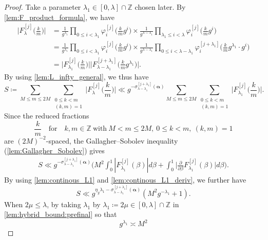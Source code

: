 \documentclass[hidelinks]{amsart}
\numberwithin{equation}{section}
\theoremstyle{plain}
\theoremstyle{definition}
\let\tmp\phi
\let\phi\varphi
\let\varphi\tmp
\let\tmp\epsilon
\let\epsilon\varepsilon
\let\varepsilon\tmp
\begin{document}
\begin{proof}
Take a parameter $\lambda_{1}\in[0,\lambda]\cap\mathbb{Z}$ chosen later.
By \cref{lem:F_product_formula}, we have
\begin{align}
\biggl|F_{\lambda}^{[j]}\biggl(\frac{k}{m}\biggr)\biggr|
&=
\frac{1}{g^{\lambda_{1}}}
\prod_{0\le i<\lambda_{1}}
\phi_{i}^{[j]}\biggl(\frac{k}{m}g^{i}\biggr)
\times
\frac{1}{g^{\lambda-\lambda_{1}}}
\prod_{\lambda_{1}\le i<\lambda}
\phi_{i}^{[j]}\biggl(\frac{k}{m}g^{i}\biggr)\\
&=
\frac{1}{g^{\lambda_{1}}}
\prod_{0\le i<\lambda_{1}}
\phi_{i}^{[j]}\biggl(\frac{k}{m}g^{i}\biggr)
\times
\frac{1}{g^{\lambda-\lambda_{1}}}
\prod_{0\le i<\lambda-\lambda_{1}}
\phi_{i}^{[j+\lambda_{1}]}\biggl(\frac{k}{m}g^{\lambda_{1}}\cdot g^{i}\biggr)\\
&=
\biggl|F_{\lambda_{1}}^{[j]}\biggl(\frac{k}{m}\biggr)\biggr|
\biggl|F_{\lambda-\lambda_{1}}^{[j+\lambda_{1}]}\biggl(\frac{k}{m}g^{\lambda_{1}}\biggr)\biggr|.
\end{align}
By using \cref{lem:L_infty_general}, we thus have
\[
S
\coloneqq
\sum_{M\le m\le 2M}
\sum_{\substack{
0\le k<m\\
(k,m)=1
}}
\biggl|F_{\lambda}^{[j]}\biggl(\frac{k}{m}\biggr)\biggr|
\ll
g^{-\sigma_{\lambda-\lambda_{1}}^{[j+\lambda_{1}]}(\bm{\alpha})}
\sum_{M\le m\le 2M}
\sum_{\substack{
0\le k<m\\
(k,m)=1
}}
\biggl|F_{\lambda_{1}}^{[j]}\biggl(\frac{k}{m}\biggr)\biggr|.
\]
Since the reduced fractions
\[
\frac{k}{m}
\quad\text{for}\quad
k,m\in\mathbb{Z}
\ \text{with}\ 
M<m\le 2M,\ 
0\le k<m,\ 
(k,m)=1
\]
are $(2M)^{-2}$-spaced, the Gallagher--Sobolev inequality (\cref{lem:Gallagher_Sobolev}) gives
\begin{align}
S
\ll
g^{-\sigma_{\lambda-\lambda_{1}}^{[j+\lambda_{1}]}(\bm{\alpha})}
\biggl(
M^{2}
\int_{0}^{1}|F_{\lambda_{1}}^{[j]}(\beta)|d\beta
+
\int_{0}^{1}
\biggl|\frac{\partial}{\partial\beta}F_{\lambda_{1}}^{[j]}(\beta)\biggr|d\beta
\biggr).
\end{align}
By using \cref{lem:continous_L1} and \cref{lem:continous_L1_deriv}, we further have
\begin{equation}
\label{lem:hybrid_bound:prefinal}
S
\ll
g^{\eta_{g}\lambda_{1}-\sigma_{\lambda-\lambda_{1}}^{[j+\lambda_{1}]}(\bm{\alpha})}
(M^{2}g^{-\lambda_{1}}+1).
\end{equation}
When $2\mu\le\lambda$, by taking $\lambda_{1}$ by $\lambda_{1}\coloneqq2\mu\in[0,\lambda]\cap\mathbb{Z}$
in \cref{lem:hybrid_bound:prefinal} so that
\[
g^{\lambda_{1}}\asymp M^{2}
\]
\end{proof}
\end{document}
